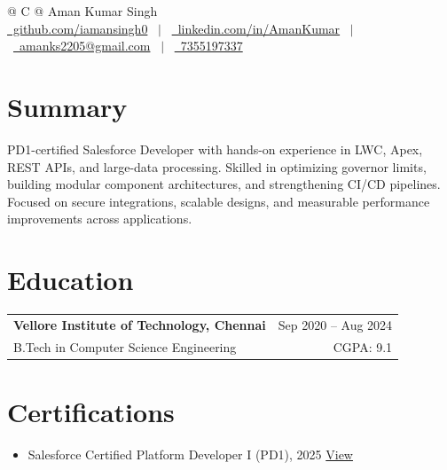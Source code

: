 \documentclass[a4paper,10pt]{article}
\begin{document}
\pagestyle{empty}

\begin{tabularx}{\linewidth}{@{} C @{}}
\Huge{Aman Kumar Singh} \\[7.5pt]
\href{https://github.com/iamansingh0}{\raisebox{-0.05\height}\faGithub\ github.com/iamansingh0} \ $|$ \ 
\href{https://www.linkedin.com/in/aman-kumar-singh-08b2b220b/}{\raisebox{-0.05\height}\faLinkedin\ linkedin.com/in/AmanKumar} \ $|$ \ 
\href{mailto:amanks2205@gmail.com}{\raisebox{-0.05\height}\faEnvelope\ amanks2205@gmail.com} \ $|$ \ 
\href{tel:+91-7355197337}{\raisebox{-0.05\height}\faMobile\ 7355197337} \\
\end{tabularx}

\section*{Summary}
PD1-certified Salesforce Developer with hands-on experience in LWC, Apex, REST APIs, and large-data processing. Skilled in optimizing governor limits, building modular component architectures, and strengthening CI/CD pipelines. Focused on secure integrations, scalable designs, and measurable performance improvements across applications.

\section*{Education}
\begin{tabularx}{\linewidth}{@{}X r@{}}
\textbf{Vellore Institute of Technology, Chennai} & Sep 2020 -- Aug 2024 \\
B.Tech in Computer Science Engineering & CGPA: 9.1 \\
\end{tabularx}

\section*{Certifications}
\begin{itemize}[leftmargin=1em, itemsep=3pt]
    \item Salesforce Certified Platform Developer I (PD1), 2025 \hfill \href{https://www.salesforce.com/trailblazer/iamansingh0}{\small View}
\end{itemize}

\end{document}
